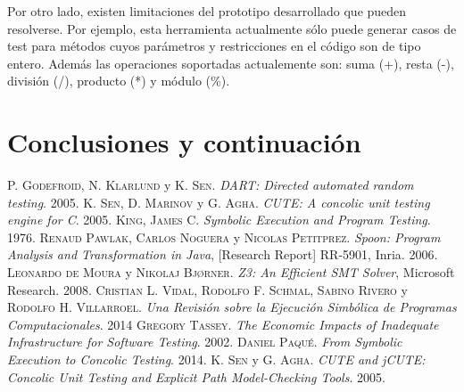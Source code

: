 \documentclass{llncs}
\begin{document}
Por otro lado, existen limitaciones del prototipo desarrollado que pueden resolverse. Por ejemplo, esta herramienta actualmente sólo puede generar casos de test
para métodos cuyos parámetros y restricciones en el código son de tipo entero. Además las operaciones soportadas actualemente son: suma (+), resta (-), división (/),
producto (*) y módulo (\%).

\section{Conclusiones y continuación}



\begin{thebibliography}{X}
 \textsc{P. Godefroid}, \textsc{N. Klarlund} y \textsc{K. Sen}. \textit{DART: Directed automated random testing}. 2005.
 \textsc{K. Sen}, \textsc{D. Marinov} y \textsc{G. Agha}. \textit{CUTE: A concolic unit testing engine for C}. 2005.
 \textsc{King, James C}. \textit{Symbolic Execution and Program Testing}. 1976.
 \textsc{Renaud Pawlak}, \textsc{Carlos Noguera} y \textsc{Nicolas Petitprez}. \textit{Spoon: Program Analysis and Transformation in Java}, [Research Report] RR-5901, Inria. 2006.
 \textsc{Leonardo de Moura} y \textsc{Nikolaj Bjørner}. \textit{Z3: An Efficient SMT Solver}, Microsoft Research. 2008.
 \textsc{Cristian L. Vidal}, \textsc{Rodolfo F. Schmal}, \textsc{Sabino Rivero} y \textsc{Rodolfo H. Villarroel}. \textit{Una Revisión sobre la Ejecución Simbólica de Programas Computacionales}. 2014
 \textsc{Gregory Tassey}. \textit{The Economic Impacts of Inadequate Infrastructure for Software Testing}. 2002.
 \textsc{Daniel Paqué}. \textit{From Symbolic Execution to  Concolic Testing}. 2014.
 \textsc{K. Sen} y \textsc{G. Agha}. \textit{CUTE and jCUTE: Concolic Unit Testing and Explicit Path Model-Checking Tools}. 2005.
\end{thebibliography}
\end{document}
